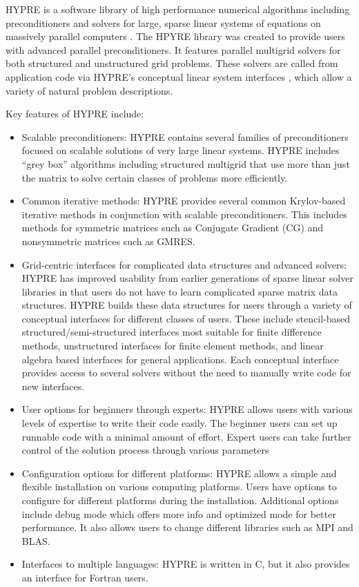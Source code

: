 HYPRE is a software library of high performance numerical algorithms including preconditioners and solvers for large, sparse linear systems of equations on massively parallel computers \cite{Falgout2006TheDA}. 
The HPYRE library was created to provide users with advanced parallel preconditioners. It features parallel multigrid solvers for both structured and unstructured grid problems.
These solvers are called from application code via HYPRE's conceptual linear system interfaces \cite{10.5555/1125403.1125423}, which allow a variety of natural problem descriptions.

Key features of HYPRE include:
\begin{itemize}
    \item Scalable preconditioners: HYPRE contains several families of preconditioners focused on scalable solutions of very large linear systems.
    HYPRE includes ``grey box'' algorithms including structured multigrid that use more than just the matrix to solve certain classes of problems more efficiently.
    \item Common iterative methods: HYPRE provides several common Krylov-based iterative methods in conjunction with scalable preconditioners. 
    This includes methods for symmetric matrices such as Conjugate Gradient (CG) and nonsymmetric matrices such as GMRES.
    \item Grid-centric interfaces for complicated data structures and advanced solvers: HYPRE has improved usability from earlier generations of sparse linear solver libraries in that users do not have to learn complicated sparse matrix data structures.
    HYPRE builds these data structures for users through a variety of conceptual interfaces for different classes of users.
    These include stencil-based structured/semi-structured interfaces most suitable for finite difference methods, unstructured interfaces for finite element methods, and linear algebra based interfaces for general applications.
    Each conceptual interface provides access to several solvers without the need to manually write code for new interfaces.
    \item User options for beginners through experts: HYPRE allows users with various levels of expertise to write their code easily. The beginner users can set up runnable code with a minimal amount of effort. Expert users can take further control of the solution process through various parameters
    \item Configuration options for different platforms: HYPRE allows a simple and flexible installation on various computing platforms. Users have options to configure for different platforms during the installation.
    Additional options include debug mode which offers more info and optimized mode for better performance.
    It also allows users to change different libraries such as MPI and BLAS.
    \item Interfaces to multiple languages: HYPRE is written in C, but it also provides an interface for Fortran users.
\end{itemize}